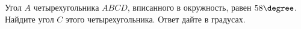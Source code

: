 \begin{ex}
	\begin{condition}
		Угол \( A  \) четырехугольника \( ABCD \), вписанного в окружность, равен \( 58\degree\). Найдите угол \( C  \) этого четырехугольника. Ответ дайте в градусах.
	\end{condition}
\end{ex}
